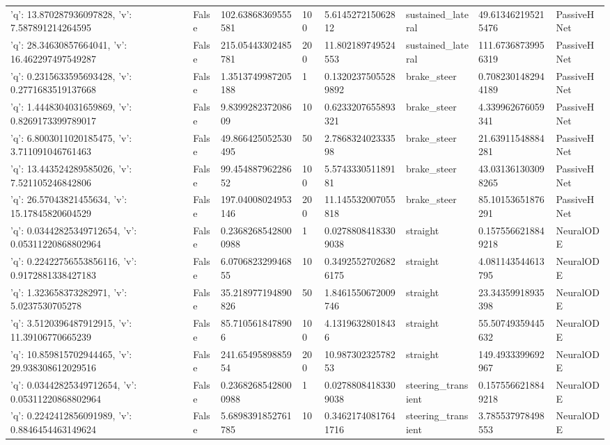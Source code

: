 \begin{tabular}{llllllll}
{'q': 13.870287936097828, 'v': 7.587891214264595} & False & 102.63868369555581 & 100 & 5.614527215062812 & sustained\_lateral & 49.613462195215476 & PassiveHNet \\
{'q': 28.34630857664041, 'v': 16.462297497549287} & False & 215.05443302485781 & 200 & 11.802189749524553 & sustained\_lateral & 111.67368739956319 & PassiveHNet \\
{'q': 0.2315633595693428, 'v': 0.2771683519137668} & False & 1.3513749987205188 & 1 & 0.13202375055289892 & brake\_steer & 0.7082301482944189 & PassiveHNet \\
{'q': 1.4448304031659869, 'v': 0.8269173399789017} & False & 9.839928237208609 & 10 & 0.6233207655893321 & brake\_steer & 4.339962676059341 & PassiveHNet \\
{'q': 6.8003011020185475, 'v': 3.711091046761463} & False & 49.866425052530495 & 50 & 2.786832402333598 & brake\_steer & 21.63911548884281 & PassiveHNet \\
{'q': 13.443524289585026, 'v': 7.521105246842806} & False & 99.45488796228652 & 100 & 5.574333051189181 & brake\_steer & 43.031361303098265 & PassiveHNet \\
{'q': 26.57043821455634, 'v': 15.17845820604529} & False & 197.04008024953146 & 200 & 11.145532007055818 & brake\_steer & 85.10153651876291 & PassiveHNet \\
{'q': 0.03442825349712654, 'v': 0.05311220868802964} & False & 0.23682685428000988 & 1 & 0.02788084183309038 & straight & 0.1575566218849218 & NeuralODE \\
{'q': 0.22422756553856116, 'v': 0.9172881338427183} & False & 6.070682329946855 & 10 & 0.34925527026826175 & straight & 4.081143544613795 & NeuralODE \\
{'q': 1.323658373282971, 'v': 5.0237530705278} & False & 35.218977194890826 & 50 & 1.8461550672009746 & straight & 23.34359918935398 & NeuralODE \\
{'q': 3.5120396487912915, 'v': 11.39106770665239} & False & 85.7105618478906 & 100 & 4.13196328018436 & straight & 55.50749359445632 & NeuralODE \\
{'q': 10.859815702944465, 'v': 29.938308612029516} & False & 241.6549589885954 & 200 & 10.98730232578253 & straight & 149.4933399692967 & NeuralODE \\
{'q': 0.03442825349712654, 'v': 0.05311220868802964} & False & 0.23682685428000988 & 1 & 0.02788084183309038 & steering\_transient & 0.1575566218849218 & NeuralODE \\
{'q': 0.2242412856091989, 'v': 0.8846454463149624} & False & 5.6898391852761785 & 10 & 0.34621740817641716 & steering\_transient & 3.785537978498553 & NeuralODE \\

\end{tabular}
